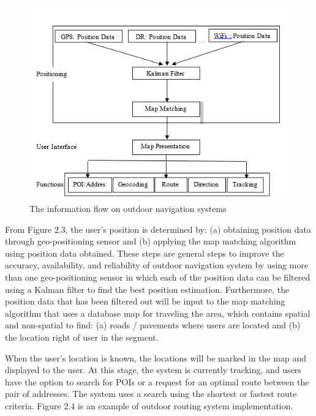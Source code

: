 \begin{figure}[h!]
	\centering
	\includegraphics[scale=0.7]{figure3.png}
	\caption{The information flow on outdoor navigation systems}
	\label{fig:figure3}
\end{figure}

From Figure 2.3, the user's position is determined by: (a) obtaining position data through geo-positioning sensor and (b) applying the map matching algorithm using position data obtained. These steps are general steps to improve the accuracy, availability, and reliability of outdoor navigation system by using more than one geo-positioning sensor in which each of the position data can be filtered using a Kalman filter to find the best position estimation. Furthermore, the position data that has been filtered out will be input to the map matching algorithm that uses a database map for traveling the area, which contains spatial and non-spatial to find: (a) roads / pavements where users are located and (b) the location right of user in the segment.

When the user's location is known, the locations will be marked in the map and displayed to the user. At this stage, the system is currently tracking, and users have the option to search for POIs or a request for an optimal route between the pair of addresses. The system uses a search using the shortest or fastest route criteria\cite{karimi2011universal}. Figure 2.4 is an example of outdoor routing system implementation.


